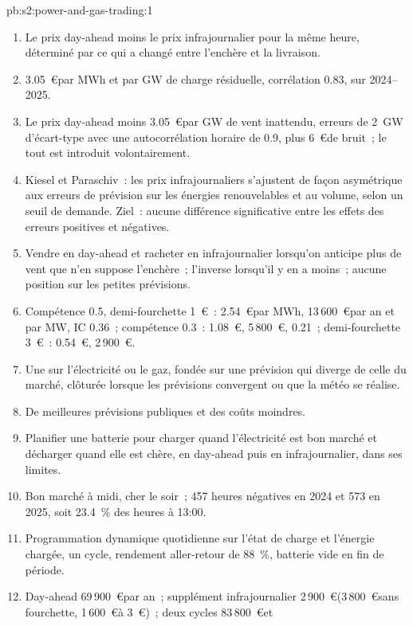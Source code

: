 \begin{solution}{pb:s2:power-and-gas-trading:1}
\begin{enumerate}
\item Le prix day-ahead moins le prix infrajournalier pour la même heure, déterminé par ce qui a changé entre l'enchère et la livraison.
\item 3.05~\euro par MWh et par GW de charge résiduelle, corrélation 0.83, sur 2024--2025.
\item Le prix day-ahead moins 3.05~\euro par GW de vent inattendu, erreurs de 2~GW d'écart-type avec une autocorrélation horaire de 0.9, plus 6~\euro de
bruit~; le tout est introduit volontairement.
\item Kiesel et Paraschiv~: les prix infrajournaliers s'ajustent de façon asymétrique aux erreurs de prévision sur les énergies renouvelables et au volume, selon un seuil de demande. Ziel~: aucune
différence significative entre les effets des erreurs positives et négatives.
\item Vendre en day-ahead et racheter en infrajournalier lorsqu'on anticipe plus de vent que n'en suppose l'enchère~; l'inverse lorsqu'il y en a moins~; aucune position sur les petites prévisions.
\item Compétence 0.5, demi-fourchette 1~\euro~: 2.54~\euro par MWh, 13\,600~\euro par an et par MW, IC 0.36~; compétence 0.3~: 1.08~\euro, 5\,800~\euro, 0.21~; demi-fourchette
3~\euro~: 0.54~\euro, 2\,900~\euro.
\item Une  sur l'électricité ou le gaz, fondée sur une prévision qui diverge de celle du marché, clôturée lorsque les prévisions convergent ou que la météo se réalise.
\item De meilleures prévisions publiques et des coûts moindres.
\item Planifier une batterie pour charger quand l'électricité est bon marché et décharger quand elle est chère, en day-ahead puis en infrajournalier, dans ses limites.
\item Bon marché à midi, cher le soir~; 457 heures négatives en 2024 et 573 en 2025, soit 23.4~\% des heures à 13:00.
\item Programmation dynamique quotidienne sur l'état de charge et l'énergie chargée, un cycle, rendement aller-retour de 88~\%, batterie vide en fin de période.
\item Day-ahead 69\,900~\euro par an~; supplément infrajournalier 2\,900~\euro (3\,800~\euro sans fourchette, 1\,600~\euro à 3~\euro)~; deux cycles 83\,800~\euro et

\end{enumerate}
\end{solution}
